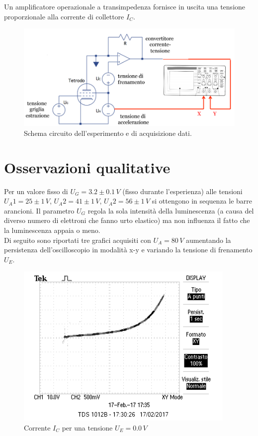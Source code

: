 \documentclass[10pt,a4paper]{article}
\begin{document}
Un amplificatore operazionale a transimpedenza fornisce in uscita una tensione proporzionale alla corrente di collettore $I_C$.\\

\begin{figure}[!htb]
  \centering
  \includegraphics[scale=.5]{circuito.png}
\caption{Schema circuito dell'esperimento e di acquisizione dati.}
\label{circuito}
\end{figure}


\section{Osservazioni qualitative}

Per un valore fisso di $U_G = 3.2 \pm 0.1 \, V $ (fisso durante l'esperienza) alle tensioni $U_A1 = 25 \pm 1 \, V$, $U_A2 = 41 \pm 1 \, V$, $U_A2 = 56 \pm 1 \, V$ si ottengono in sequenza le barre arancioni. Il parametro $U_G$ regola la sola intensità della luminescenza (a causa del diverso numero di elettroni che fanno urto elastico) ma non influenza il fatto che la luminescenza appaia o meno.\\

Di seguito sono riportati tre grafici acquisiti con $U_A = 80 \, V$ aumentando la persistenza dell'oscilloscopio in modalità x-y e variando la tensione di frenamento $U_E$.\\

\begin{figure}[!htb]
  \centering
  \includegraphics[scale=1.0]{uezero.png}
\caption{Corrente $I_C$ per una tensione $U_E = 0.0 \, V$}
\label{grafico1}
\end{figure}
\end{document}
